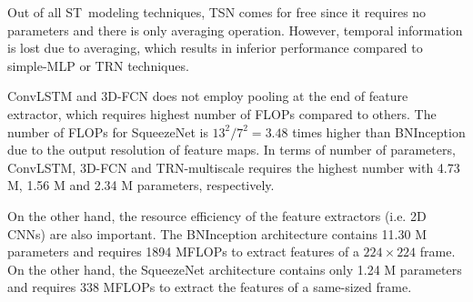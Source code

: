 \documentclass[runningheads]{llncs}
\begin{document}
Out of all ST~modeling techniques, TSN comes for free since it requires no parameters and there is only averaging operation. However, temporal information is lost due to averaging, which results in inferior performance compared to simple-MLP or TRN techniques.

ConvLSTM and 3D-FCN does not employ pooling at the end of feature extractor, which requires highest number of FLOPs compared to others. The number of FLOPs for SqueezeNet is $13^2 / 7^2 = 3.48$ times higher than BNInception due to the output resolution of feature maps. In terms of number of parameters, ConvLSTM, 3D-FCN and TRN-multiscale requires the highest number with 4.73 M, 1.56 M and 2.34 M parameters, respectively. 

On the other hand, the resource efficiency of the feature extractors (i.e. 2D CNNs) are also important. The BNInception architecture contains 11.30 M parameters and requires 1894 MFLOPs to extract features of a \mbox{$224 \times 224$} frame. On the other hand, the SqueezeNet architecture contains only 1.24 M parameters and requires 338 MFLOPs to extract the features of a same-sized frame.
\end{document}
